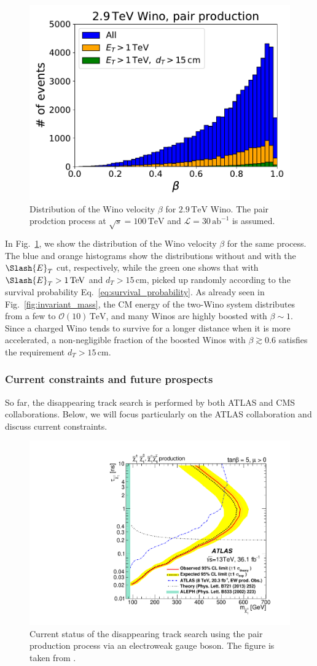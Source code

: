 \documentclass[12pt,twoside,book]{article}
\begin{document}
\begin{figure}[t]
  \centering
  \includegraphics[width=0.5\hsize]{beta.pdf}
  \caption{
    Distribution of the Wino velocity $\beta$ for $2.9\,\mathrm{TeV}$ Wino.
    The pair prodction process at $\sqrt{s}=100\,\mathrm{TeV}$ and $\mathcal{L} = 30\,\mathrm{ab}^{-1}$ is assumed.
  }
  \label{fig:beta}
\end{figure}

In Fig.~\ref{fig:beta}, we show the distribution of the Wino velocity $\beta$ for the same process.
The blue and orange histograms show the distributions without and with the $\Slash{E}_T$ cut, respectively, while the green one shows that with $\Slash{E}_T > 1\,\mathrm{TeV}$ and $d_T > 15\,\mathrm{cm}$, picked up randomly according to the survival probability Eq.~\eqref{eq:survival_probability}.
As already seen in Fig.~\ref{fig:invariant_mass}, the CM energy of the two-Wino system distributes from a few to $\mathcal{O} (10) \,\mathrm{TeV}$, and many Winos are highly boosted with $\beta \sim 1$.
Since a charged Wino tends to survive for a longer distance when it is more accelerated, a non-negligible fraction of the boosted Winos with $\beta \gtrsim 0.6$ satisfies the requirement $d_T > 15\,\mathrm{cm}$.


\subsubsection*{Current constraints and future prospects}

So far, the disappearing track search is performed by both ATLAS \cite{Aaboud:2017mpt} and CMS \cite{Sirunyan:2018ldc} collaborations.
Below, we will focus particularly on the ATLAS collaboration and discuss current constraints.

\begin{figure}[t]
  \centering
  \includegraphics[width=0.5\hsize]{ATLAS_disappearing_track.pdf}
  \caption{
    Current status of the disappearing track search using the pair production process via an electroweak gauge boson.
    The figure is taken from \cite{Aaboud:2017mpt}.
  }
  \label{fig:ATLAS_disappearing_track}
\end{figure}
\end{document}
